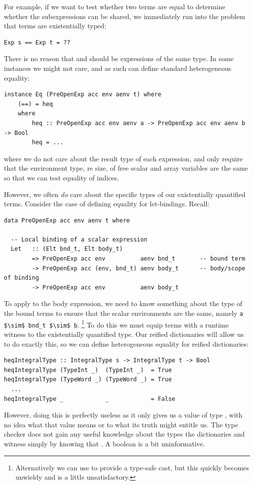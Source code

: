 For example, if we want to test whether two terms are equal to determine whether
the subexpressions can be shared, we immediately run into the problem that terms
are existentially typed:
%
\begin{lstlisting}[style=haskell]
Exp s == Exp t = ??
\end{lstlisting}
%
There is no reason that  and  should be expressions of the same
type. In some instances we might not care, and as such can define standard
heterogeneous equality:
%
\begin{lstlisting}[style=haskell]
instance Eq (PreOpenExp acc env aenv t) where
    (==) = heq
    where
        heq :: PreOpenExp acc env aenv a -> PreOpenExp acc env aenv b -> Bool
        heq = ...
\end{lstlisting}
%
where we do not care about the result type of each expression, and only require
that the environment type, re size, of free scalar and array variables are the
same so that we can test equality of  indices.

However, we often \emph{do} care about the specific types of our existentially
quantified terms. Consider the case of defining equality for let-bindings.
Recall:
%
\begin{lstlisting}[style=haskell]
data PreOpenExp acc env aenv t where

  -- Local binding of a scalar expression
  Let   :: (Elt bnd_t, Elt body_t)
        => PreOpenExp acc env          aenv bnd_t       -- bound term
        -> PreOpenExp acc (env, bnd_t) aenv body_t      -- body/scope of binding
        -> PreOpenExp acc env          aenv body_t
\end{lstlisting}
%
To apply  to the body expression, we need to know something about
the type of the bound terms to ensure that the scalar environments are the same,
namely \lstinline[style=inline,mathescape]{a $\sim$ bnd_t $\sim$ b}.%
\footnote{Alternatively we can use  to provide a
type-safe cast, but this quickly becomes unwieldy and is a little
unsatisfactory.} To do this we must equip terms with a runtime witness to the
existentially quantified type. Our reified dictionaries will allow us to do
exactly this, so we can define heterogeneous equality for reified dictionaries:
%
\begin{lstlisting}[style=haskell]
heqIntegralType :: IntegralType s -> IntegralType t -> Bool
heqIntegralType (TypeInt _)  (TypeInt _)  = True
heqIntegralType (TypeWord _) (TypeWord _) = True
  ...
heqIntegralType _            _            = False
\end{lstlisting}
%
However, doing this is perfectly useless as it only gives us a value of type
, with no idea what that value means or to what its truth might
entitle us. The type checker does not gain any useful knowledge about the types
the dictionaries  and  witness simply by knowing that
. A boolean is a bit uninformative.

